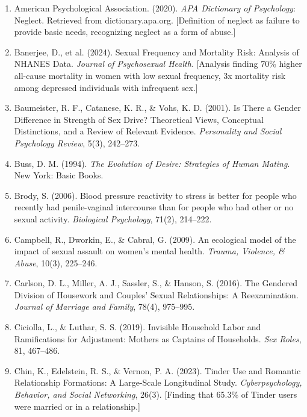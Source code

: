 \documentclass[12pt, letterpaper]{article}
\begin{document}
\begin{enumerate}
    \item American Psychological Association. (2020). \textit{APA Dictionary of Psychology}: Neglect. Retrieved from dictionary.apa.org. [Definition of neglect as failure to provide basic needs, recognizing neglect as a form of abuse.]
    
    \item Banerjee, D., et al. (2024). Sexual Frequency and Mortality Risk: Analysis of NHANES Data. \textit{Journal of Psychosexual Health}. [Analysis finding 70\% higher all-cause mortality in women with low sexual frequency, 3x mortality risk among depressed individuals with infrequent sex.]
    
    \item Baumeister, R. F., Catanese, K. R., \& Vohs, K. D. (2001). Is There a Gender Difference in Strength of Sex Drive? Theoretical Views, Conceptual Distinctions, and a Review of Relevant Evidence. \textit{Personality and Social Psychology Review}, 5(3), 242--273.
    
    \item Buss, D. M. (1994). \textit{The Evolution of Desire: Strategies of Human Mating}. New York: Basic Books.
    
    \item Brody, S. (2006). Blood pressure reactivity to stress is better for people who recently had penile-vaginal intercourse than for people who had other or no sexual activity. \textit{Biological Psychology}, 71(2), 214--222.
    
    \item Campbell, R., Dworkin, E., \& Cabral, G. (2009). An ecological model of the impact of sexual assault on women's mental health. \textit{Trauma, Violence, \& Abuse}, 10(3), 225--246.
    
    \item Carlson, D. L., Miller, A. J., Sassler, S., \& Hanson, S. (2016). The Gendered Division of Housework and Couples' Sexual Relationships: A Reexamination. \textit{Journal of Marriage and Family}, 78(4), 975--995.
    
    \item Ciciolla, L., \& Luthar, S. S. (2019). Invisible Household Labor and Ramifications for Adjustment: Mothers as Captains of Households. \textit{Sex Roles}, 81, 467--486.
    
    \item Chin, K., Edelstein, R. S., \& Vernon, P. A. (2023). Tinder Use and Romantic Relationship Formations: A Large-Scale Longitudinal Study. \textit{Cyberpsychology, Behavior, and Social Networking}, 26(3). [Finding that 65.3\% of Tinder users were married or in a relationship.]
    

\end{enumerate}
\end{document}
